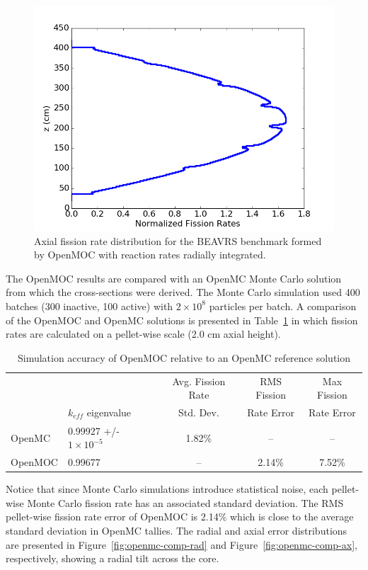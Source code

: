 \begin{figure}[ht!]
	\centering
	\includegraphics[width=0.8\linewidth]{figures/results/rr-plots/beavrs-3d-axial.png}
	\caption{Axial fission rate distribution for the BEAVRS benchmark formed by OpenMOC with reaction rates radially integrated.}
	\label{fig:full-core-axial}
\end{figure}

\newpage
The OpenMOC results are compared with an OpenMC Monte Carlo solution from which the cross-sections were derived. The Monte Carlo simulation used 400 batches (300 inactive, 100 active) with $2 \times 10^8$ particles per batch. A comparison of the OpenMOC and OpenMC solutions is presented in Table~\ref{tab:openmc-comparison} in which fission rates are calculated on a pellet-wise scale (2.0 cm axial height).

\begin{table}[ht]
	\centering
	\caption{Simulation accuracy of OpenMOC relative to an OpenMC reference solution}
	\medskip
	\begin{tabular}{l|l|c|c|c}
		&                               & Avg. Fission Rate & RMS Fission & Max Fission \\
		& $k_{\textit{eff}}$ eigenvalue & Std. Dev.         & Rate Error & Rate Error \\
		\hline
		OpenMC  & 0.99927 +/- $1 \times 10^{-5}$  & 1.82\% & --     & -- \\
		OpenMOC & 0.99677                         & --     & 2.14\% & 7.52\% \\
		\hline
	\end{tabular}
	\label{tab:openmc-comparison}
\end{table}

Notice that since Monte Carlo simulations introduce statistical noise, each pellet-wise Monte Carlo fission rate has an associated standard deviation. The RMS pellet-wise fission rate error of OpenMOC is 2.14\% which is close to the average standard deviation in OpenMC tallies. The radial and axial error distributions are presented in Figure~\ref{fig:openmc-comp-rad} and Figure~\ref{fig:openmc-comp-ax}, respectively, showing a radial tilt across the core.

